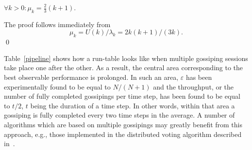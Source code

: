 \documentclass{elsart}
\begin{document}
\begin{prop}
$\forall k>0: \mu_k = \frac23 (k+1)$.
\end{prop}
\begin{pf}
The proof follows immediately from 
\[ \mu_k = U(k)/\lambda_k = 2k(k+1)/(3k).\]
\qed
\end{pf}

Table~\ref{pipeline} shows how a run-table looks like when multiple
gossiping sessions take place one after the other.
As a result, the central area corresponding to the best observable
performance is prolonged. In such an area, $\varepsilon$ has been
experimentally found to be equal to $N/(N+1)$ and the throughput,
or the number of fully completed gossipings per time step, has been
found to be equal to $t/2$, $t$ being the duration of a time step.
In other words, within that area a gossiping is fully completed every
two time steps in the average. A number of algorithms which are based
on multiple gossipings may greatly benefit from this approach, e.g.,
those implemented in the distributed voting algorithm described 
in~\cite{DeDL98e}.
\end{document}
